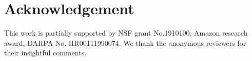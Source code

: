 \section*{Acknowledgement}
This work is partially supported by NSF grant No.1910100, Amazon research award, DARPA No. HR00111990074. We thank the anonymous reviewers for their insightful comments.